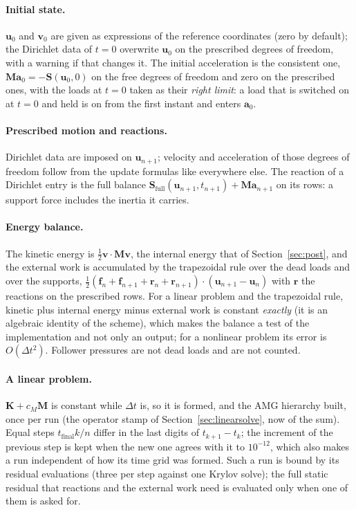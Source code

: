 \documentclass[11pt]{article}
\newcommand{\bu}{\bm{u}}
\newcommand{\bK}{\bm{K}}
\newcommand{\bM}{\bm{M}}
\begin{document}
\paragraph{Initial state.}
$\bu_0$ and $\bm v_0$ are given as expressions of the reference coordinates
(zero by default); the Dirichlet data of $t = 0$ overwrite $\bu_0$ on the
prescribed degrees of freedom, with a warning if that changes it.  The
initial acceleration is the consistent one,
$\bM\bm a_0 = -\bm S(\bm u_0, 0)$ on the free degrees of freedom and zero
on the prescribed ones, with the loads at $t = 0$ taken as their \emph{right
limit}: a load that is switched on at $t = 0$ and held is on from the first
instant and enters $\bm a_0$.

\paragraph{Prescribed motion and reactions.}
Dirichlet data are imposed on $\bm u_{n+1}$; velocity and acceleration of
those degrees of freedom follow from the update formulas like everywhere
else.  The reaction of a Dirichlet entry is the full balance
$\bm S_{\text{full}}(\bm u_{n+1}, t_{n+1}) + \bM\bm a_{n+1}$ on its rows: a
support force includes the inertia it carries.

\paragraph{Energy balance.}
The kinetic energy is $\tfrac12\bm v\cdot\bM\bm v$, the internal energy that
of Section~\ref{sec:post}, and the external work is accumulated by the
trapezoidal rule over the dead loads and over the supports,
$\tfrac12(\bm f_n + \bm f_{n+1} + \bm r_n + \bm r_{n+1})\cdot(\bm u_{n+1} -
\bm u_n)$ with $\bm r$ the reactions on the prescribed rows.  For a linear
problem and the trapezoidal rule, kinetic plus internal energy minus
external work is constant \emph{exactly} (it is an algebraic identity of the
scheme), which makes the balance a test of the implementation and not only
an output; for a nonlinear problem its error is $O(\Delta t^2)$.  Follower
pressures are not dead loads and are not counted.

\paragraph{A linear problem.}
$\bK + c_M\bM$ is constant while $\Delta t$ is, so it is formed, and the
AMG hierarchy built, once per run (the operator stamp of
Section~\ref{sec:linearsolve}, now of the sum).  Equal steps
$t_{\text{final}}k/n$ differ in the last digits of $t_{k+1} - t_k$; the
increment of the previous step is kept when the new one agrees with it to
$10^{-12}$, which also makes a run independent of how its time grid was
formed.  Such a run is bound by its residual evaluations (three per step
against one Krylov solve); the full static residual that reactions and the
external work need is evaluated only when one of them is asked for.
\end{document}
